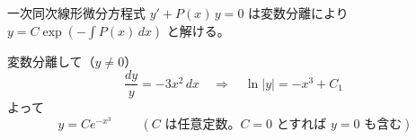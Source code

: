 
一次同次線形微分方程式 $y' + P(x)\,y = 0$ は変数分離により $y = C\exp\left(-\displaystyle\int P(x)\,dx\right)$ と解ける。

変数分離して（$y \neq 0$）
\[
\frac{dy}{y} = -3x^{2}\,dx
\quad\Longrightarrow\quad
\ln|y| = -x^{3} + C_{1}
\]
よって
\[
\boxed{\; y = Ce^{-x^{3}} \;}
\qquad (C \text{ は任意定数。} C = 0 \text{ とすれば } y = 0 \text{ も含む})
\]
